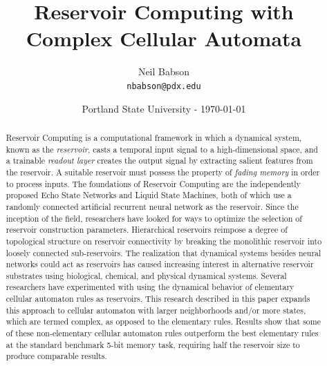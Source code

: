 \documentclass{article}
\title{Reservoir Computing with Complex Cellular Automata}
\author{Neil Babson\\ \texttt{nbabson@pdx.edu}}
\date{Portland State University -  \today}
\begin{document}
\maketitle


\begin{abstract}
Reservoir Computing is a computational framework in which a dynamical system, 
          known as the \textit{reservoir}, casts a temporal input signal to a 
          high-dimensional space, and a trainable \textit{readout layer} 
          creates the output signal by extracting salient features from the 
          reservoir.
A suitable reservoir  must possess the property of 
\textit{fading memory} in order to process inputs. The foundations of Reservoir Computing are the 
independently proposed Echo State Networks and Liquid State Machines, both of 
which use a randomly connected artificial recurrent neural network as the 
reservoir. Since the inception of the field, researchers have looked for ways 
to optimize the selection of reservoir construction parameters. Hierarchical 
reservoirs reimpose a degree of topological structure on reservoir connectivity 
by breaking the monolithic reservoir into loosely connected sub-reservoirs. The 
realization that dynamical systems besides neural networks could act as 
reservoirs has caused increasing interest in alternative reservoir substrates 
using biological, chemical, and physical dynamical systems. Several researchers 
have experimented with using the dynamical behavior of elementary cellular 
automaton rules as reservoirs. This research described in this paper expands 
this approach to cellular automaton with larger neighborhoods and/or more 
states, which are termed complex, as opposed to the elementary rules. Results 
show that some of these non-elementary cellular automaton rules outperform the 
best elementary rules at the standard benchmark 5-bit memory task, requiring 
half the reservoir size to produce comparable results.
\end{abstract}
\end{document}
